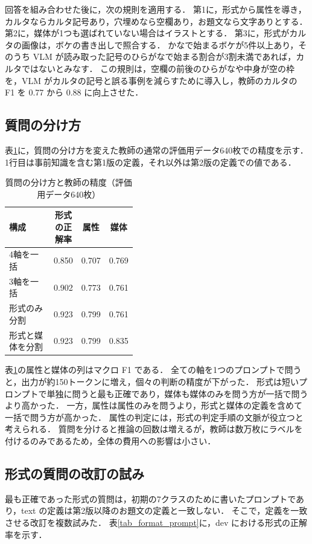 回答を組み合わせた後に，次の規則を適用する．
第1に，形式から属性を導き，カルタならカルタ記号あり，穴埋めなら空欄あり，お題文なら文字ありとする．
第2に，媒体が1つも選ばれていない場合はイラストとする．
第3に，形式がカルタの画像は，ボケの書き出しで照合する．
かなで始まるボケが5件以上あり，そのうち VLM が読み取った記号のひらがなで始まる割合が3割未満であれば，カルタではないとみなす．
この規則は，空欄の前後のひらがなや中身が空の枠を，VLM がカルタの記号と誤る事例を減らすために導入し，教師のカルタの F1 を 0.77 から 0.88 に向上させた．

\subsection{質問の分け方}
表\ref{tab_split}に，質問の分け方を変えた教師の通常の評価用データ640枚での精度を示す．
1行目は事前知識を含む第1版の定義，それ以外は第2版の定義での値である．

\begin{table}[t]
    \centering
    \caption{質問の分け方と教師の精度（評価用データ640枚）}
    \label{tab_split}
    \small
    \begin{tabular}{>{\raggedright\arraybackslash}p{0.42\linewidth}ccc}
        \toprule
        構成 & 形式の正解率 & 属性 & 媒体 \\
        \midrule
        4軸を一括 & 0.850 & 0.707 & 0.769 \\
        3軸を一括 & 0.902 & 0.773 & 0.761 \\
        形式のみ分割 & 0.923 & 0.799 & 0.761 \\
        形式と媒体を分割 & 0.923 & 0.799 & 0.835 \\
        \bottomrule
    \end{tabular}
\end{table}

表\ref{tab_split}の属性と媒体の列はマクロ F1 である．
全ての軸を1つのプロンプトで問うと，出力が約150トークンに増え，個々の判断の精度が下がった．
形式は短いプロンプトで単独に問うと最も正確であり，媒体も媒体のみを問う方が一括で問うより高かった．
一方，属性は属性のみを問うより，形式と媒体の定義を含めて一括で問う方が高かった．
属性の判定には，形式の判定手順の文脈が役立つと考えられる．
質問を分けると推論の回数は増えるが，教師は数万枚にラベルを付けるのみであるため，全体の費用への影響は小さい．

\subsection{形式の質問の改訂の試み}
最も正確であった形式の質問は，初期の7クラスのために書いたプロンプトであり，text の定義は第2版以降のお題文の定義と一致しない．
そこで，定義を一致させる改訂を複数試みた．
表\ref{tab_format_prompt}に，dev における形式の正解率を示す．

